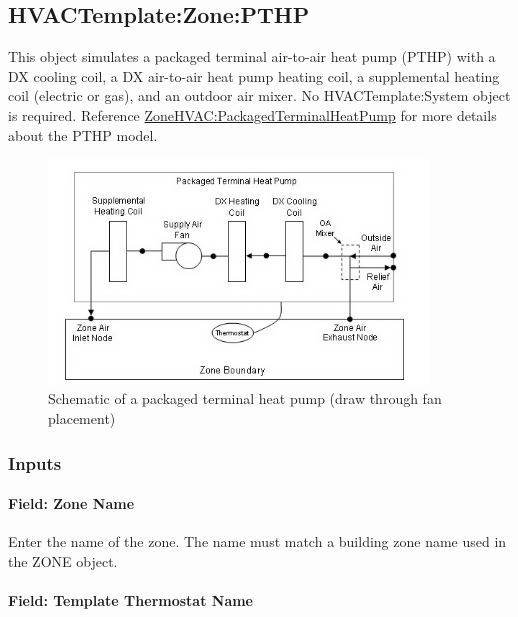 \subsection{HVACTemplate:Zone:PTHP}\label{hvactemplatezonepthp}

This object simulates a packaged terminal air-to-air heat pump (PTHP) with a DX cooling coil, a DX air-to-air heat pump heating coil, a supplemental heating coil (electric or gas), and an outdoor air mixer. No HVACTemplate:System object is required. Reference \hyperref[zonehvacpackagedterminalheatpump]{ZoneHVAC:PackagedTerminalHeatPump} for more details about the PTHP model.

\begin{figure}[hbtp] %
\centering
\includegraphics[width=0.9\textwidth, height=0.9\textheight, keepaspectratio=true]{media/image604.png}
\caption{Schematic of a packaged terminal heat pump (draw through fan placement) \protect \label{fig:schematic-of-a-packaged-terminal-heat-pump}}
\end{figure}

\subsubsection{Inputs}\label{inputs-5-014}

\paragraph{Field: Zone Name}\label{field-zone-name-4-001}

Enter the name of the zone. The name must match a building zone name used in the ZONE object.

\paragraph{Field: Template Thermostat Name}\label{field-template-thermostat-name-4}

